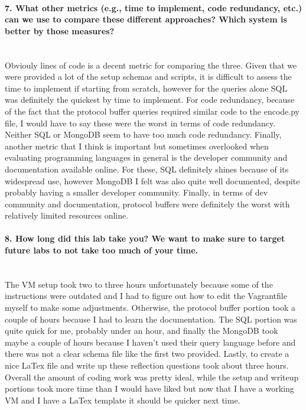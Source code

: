 \documentclass[12pt]{article}
\begin{document}
\paragraph{7. What other metrics (e.g., time to implement, code redundancy, etc.) can we use to compare these different approaches? Which system is better by those measures?}\mbox{}\\

Obviouly lines of code is a decent metric for comparing the three. Given that we were provided a lot of the setup schemas and scripts, it is difficult to assess the time to implement if starting from scratch, however for the queries alone SQL was definitely the quickest by time to implement. For code redundancy, because of the fact that the protocol buffer queries required similar code to the encode.py file, I would have to say these were the worst in terms of code redundancy. Neither SQL or MongoDB seem to have too much code redundancy.  Finally, another metric that I think is important but sometimes overlooked when evaluating programming languages in general is the developer community and documentation available online. For these, SQL definitely shines because of its widespread use, however MongoDB I felt was also quite well documented, despite probably having a smaller developer community. Finally, in terms of dev community and documentation, protocol buffers were definitely the worst with relatively limited resources online.

\paragraph{8. How long did this lab take you? We want to make sure to target future labs to not take too much of your time.}\mbox{}\\

The VM setup took two to three hours unfortunately because some of the instructions were outdated and I had to figure out how to edit the Vagrantfile myself to make some adjustments. Otherwise, the protocol buffer portion took a couple of hours because I had to learn the documentation.  The SQL portion was quite quick for me, probably under an hour, and finally the MongoDB took maybe a couple of hours because I haven't used their query language before and there was not a clear schema file like the first two provided. Lastly, to create a nice LaTex file and write up these reflection questions took about three hours. Overall the amount of coding work was pretty ideal, while the setup and writeup portions took more time than I would have liked but now that I have a working VM and I have a LaTex template it should be quicker next time.
\end{document}
